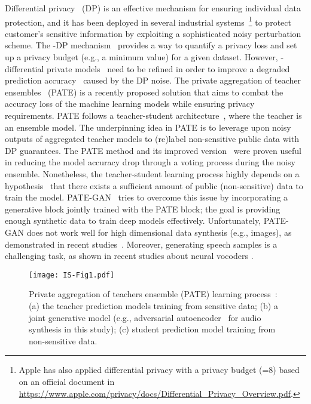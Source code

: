 \documentclass[a4paper]{article}
\begin{document}
Differential privacy~\cite{dwork2008differential} (DP) is an effective mechanism for ensuring individual data protection, and it has been deployed in several industrial systems~\cite{abadi2016deep, kifer2020guidelines}\footnote{Apple has also applied differential privacy with a privacy budget (=8) based on an official document in \url{https://www.apple.com/privacy/docs/Differential_Privacy_Overview.pdf}.} to protect customer's sensitive information by exploiting a sophisticated noisy perturbation scheme. The -DP mechanism~\cite{dwork2008differential} provides a way to quantify a privacy loss and set up a privacy budget (e.g., a minimum  value) for a given dataset. However, -differential private models~\cite{abadi2016deep} need to be refined in order to improve a degraded prediction accuracy~\cite{rajkumar2012differentially} caused by the DP noise. The private aggregation of teacher ensembles~\cite{papernot2016semi} (PATE) is a recently proposed solution that aims to combat the accuracy loss of the machine learning models while ensuring privacy requirements. PATE follows a teacher-student architecture~\cite{ hu2020relational}, where the teacher is an ensemble model. The underpinning idea in PATE is to leverage upon noisy outputs of aggregated teacher models to (re)label non-sensitive public data with DP guarantees. The PATE method and its improved version~\cite{papernot2018scalable} were proven useful in reducing the model accuracy drop through a voting process during the noisy ensemble. Nonetheless, the teacher-student learning process highly depends on a hypothesis~\cite{papernot2016semi, papernot2018scalable, jordon2019pate} that there exists a sufficient amount of public (non-sensitive) data to train the model. PATE-GAN~\cite{jordon2019pate} tries to overcome this issue by incorporating a generative block jointly trained with the PATE block; the goal is providing enough synthetic data to train deep models effectively. Unfortunately, PATE-GAN does not work well for high dimensional data synthesis (e.g., images), as demonstrated in recent studies~\cite{chen2020gs, haque2020high}. Moreover, generating speech samples is a challenging task, as shown in recent studies about neural vocoders \cite{rethage2018wavenet, oord2016wavenet}.

\begin{figure}[ht!]
    \centering
    \texttt{[image: IS-Fig1.pdf]}
    \caption{Private aggregation of teachers ensemble (PATE) learning process~\cite{papernot2016semi, papernot2018scalable}: (a) the teacher prediction models training from sensitive data; (b) a joint generative model (e.g., adversarial autoencoder~\cite{makhzani2015adversarial} for audio synthesis in this study); (c) student prediction model training from non-sensitive data. }
    \label{fig:1}
\end{figure}
\end{document}

